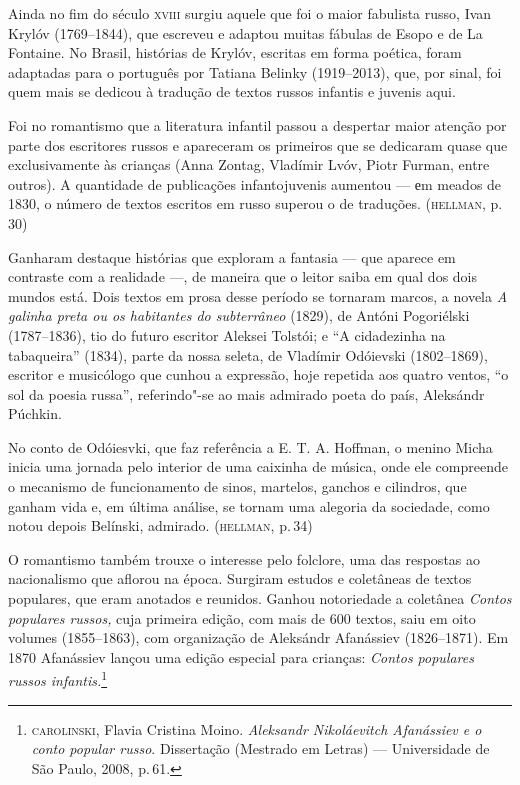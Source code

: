 Ainda no fim do século \textsc{xviii} surgiu aquele que foi o maior fabulista
russo, Ivan Krylóv (1769--1844), que escreveu e adaptou muitas fábulas
de Esopo e de La Fontaine. No Brasil, histórias de Krylóv, escritas em
forma poética, foram adaptadas para o português por Tatiana Belinky
(1919--2013), que, por sinal, foi quem mais se dedicou à tradução de
textos russos infantis e juvenis aqui.

Foi no romantismo que a literatura infantil passou a despertar maior
atenção por parte dos escritores russos e apareceram os primeiros que se
dedicaram quase que exclusivamente às crianças (Anna Zontag, Vladímir
Lvóv, Piotr Furman, entre outros). A quantidade de publicações infantojuvenis aumentou
--- еm meados de 1830, o número de textos escritos em russo superou o de
traduções. (\textsc{hellman}, p.\,30)

Ganharam destaque histórias que exploram a fantasia --- que aparece em
contraste com a realidade ---, de maneira que o leitor saiba em qual dos
dois mundos está. Dois textos em prosa desse período se tornaram marcos,
a novela \emph{A galinha preta ou os habitantes do subterrâneo} (1829),
de Antóni Pogoriélski (1787--1836), tio do futuro escritor Aleksei
Tolstói; e ``A cidadezinha na tabaqueira'' (1834), parte
da nossa seleta, de Vladímir Odóievski (1802--1869), escritor e
musicólogo que cunhou a expressão, hoje repetida aos quatro ventos, ``o
sol da poesia russa'', referindo"-se ao mais admirado poeta do país,
Aleksándr Púchkin.

No conto de Odóiesvki, que faz referência a E. T. A. Hoffman, o menino
Micha inicia uma jornada pelo interior de uma caixinha de música, onde
ele compreende o mecanismo de funcionamento de sinos, martelos, ganchos
e cilindros, que ganham vida e, em última análise, se tornam uma
alegoria da sociedade, como notou depois Belínski, admirado. (\textsc{hellman}, p.\,34)

O romantismo também trouxe o interesse pelo folclore, uma das respostas
ao nacionalismo que aflorou na época. Surgiram estudos e coletâneas de
textos populares, que eram anotados e reunidos. Ganhou notoriedade a
coletânea \emph{Contos populares russos,} cuja primeira edição, com mais
de 600 textos, saiu em oito volumes (1855--1863), com organização de
Aleksándr Afanássiev (1826--1871). Em 1870 Afanássiev lançou uma edição
especial para crianças: \emph{Contos populares russos
infantis.}\footnote{\textsc{carolinski}, Flavia Cristina Moino. \emph{Aleksandr
  Nikoláevitch Afanássiev e o conto popular russo}. Dissertação
  (Mestrado em Letras) --- Universidade de São Paulo, 2008, p.\,61.}

